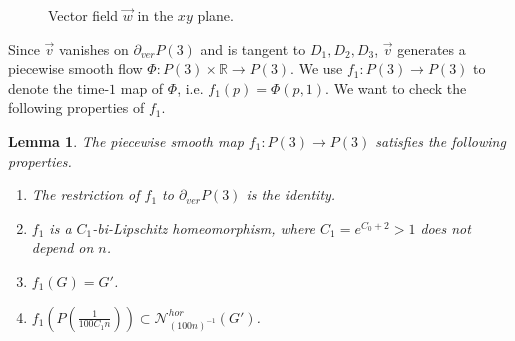 \documentclass{amsart}
\newtheorem{lem}[thm]{Lemma}
\begin{document}
\begin{figure}[htbp]
    \centering
    \def\svgwidth{4in} %
    
    \caption{Vector field $\vec{w}$ in the $xy$ plane.}
     \label{Figure4}
\end{figure}

Since $\vec{v}$ vanishes on $\partial_{ver}P(3)$ and is tangent to $D_1, D_2, D_3$, $\vec{v}$ generates a piecewise smooth flow $\Phi: P(3)\times \mathbb{R}\to P(3)$. We use $f_1:P(3)\to P(3)$ to denote the time-$1$ map of $\Phi$, i.e. $f_1(p)=\Phi(p,1)$. We want to check the following properties of $f_1$.

\begin{lem}\label{elementary}
The piecewise smooth map $f_1:P(3)\to P(3)$ satisfies the following properties.
\begin{enumerate}
\item The restriction of $f_1$ to $\partial_{ver}P(3)$ is the identity.
\item $f_1$ is a $C_1$-bi-Lipschitz homeomorphism, where $C_1=e^{C_0+2}>1$ does not depend on $n$.
\item $f_1(G)=G'$.
\item $f_1(P(\frac{1}{100C_1n}))\subset \mathcal{N}^{hor}_{(100n)^{-1}}(G')$.
\end{enumerate}
\end{lem}




\end{document}
